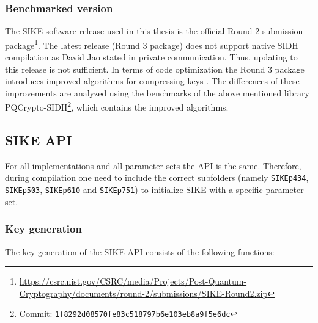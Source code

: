 \subsubsection{Benchmarked version}
The \gls{SIKE} software release used in this thesis is the official \href{https://csrc.nist.gov/CSRC/media/Projects/Post-Quantum-Cryptography/documents/round-2/submissions/SIKE-Round2.zip}{Round 2 submission package}\footnote{\url{https://csrc.nist.gov/CSRC/media/Projects/Post-Quantum-Cryptography/documents/round-2/submissions/SIKE-Round2.zip}}. The latest release (Round 3 package) does not support native SIDH compilation as David Jao stated in private communication. Thus, updating to this release is not sufficient. In terms of code optimization the Round 3 package introduces improved algorithms for compressing keys \parencite{sike2020spec}. The differences of these improvements are analyzed using the benchmarks of the above mentioned library \gls{PQCrypto-SIDH}\footnote{Commit: \texttt{1f8292d08570fe83c518797b6e103eb8a9f5e6dc}}, which contains the improved algorithms.

\subsection{\gls{SIKE} API}
For all implementations and all parameter sets the API is the same. Therefore, during compilation one need to include the correct subfolders (namely \texttt{SIKEp434}, \texttt{SIKEp503}, \texttt{SIKEp610} and \texttt{SIKEp751}) to initialize \gls{SIKE} with a specific parameter set.
\newpage
\subsubsection{Key generation}

The key generation of the \gls{SIKE} API consists of the following functions:


